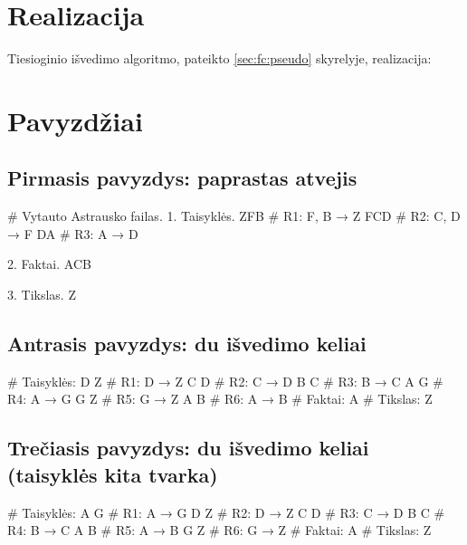 \section{Realizacija}

Tiesioginio išvedimo algoritmo, pateikto \ref{sec:fc:pseudo}
skyrelyje, realizacija:


\section{Pavyzdžiai}

\subsection{Pirmasis pavyzdys: paprastas atvejis}

\begin{pythonaienv}[fc]
# Vytauto Astrausko failas.
1. Taisyklės.
ZFB                                     # R1: F, B → Z
FCD                                     # R2: C, D → F
DA                                      # R3: A → D

2. Faktai.
ACB

3. Tikslas.
Z
\end{pythonaienv}

\subsection{Antrasis pavyzdys: du išvedimo keliai}

\begin{pythonaienv}[fc]
# Taisyklės:
D Z                                     # R1: D → Z
C D                                     # R2: C → D
B C                                     # R3: B → C
A G                                     # R4: A → G
G Z                                     # R5: G → Z
A B                                     # R6: A → B
# Faktai:
A
# Tikslas:
Z
\end{pythonaienv}

\subsection{Trečiasis pavyzdys: du išvedimo keliai (taisyklės kita tvarka)}

\begin{pythonaienv}[fc]
# Taisyklės:
A G                                     # R1: A → G
D Z                                     # R2: D → Z
C D                                     # R3: C → D
B C                                     # R4: B → C
A B                                     # R5: A → B
G Z                                     # R6: G → Z
# Faktai:
A
# Tikslas:
Z
\end{pythonaienv}

